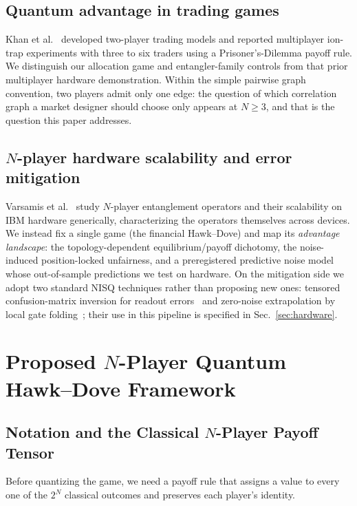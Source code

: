 \documentclass[conference,letterpaper,10pt]{IEEEtran}
\begin{document}
\subsection{Quantum advantage in trading games}
Khan et al.~\cite{khan2025} developed two-player trading models and reported
multiplayer ion-trap experiments with three to six traders using a
Prisoner's-Dilemma payoff rule. We distinguish our allocation game and
entangler-family controls from that prior multiplayer hardware demonstration. Within the simple pairwise graph convention, two players admit only one edge: the question of which correlation graph a market designer should
choose only appears at $N\ge3$, and that is the question this paper addresses.

\subsection{\texorpdfstring{$N$}{N}-player hardware scalability and error mitigation}
Varsamis et al.~\cite{varsamis2025} study $N$-player entanglement operators
and their scalability on IBM hardware generically, characterizing the operators themselves across devices. We instead fix a single game (the
financial Hawk--Dove) and map its \emph{advantage landscape}: the
topology-dependent equilibrium/payoff dichotomy, the noise-induced
position-locked unfairness, and a preregistered predictive noise model whose
out-of-sample predictions we test on hardware. On the mitigation side we adopt
two standard NISQ techniques rather than proposing new ones: tensored
confusion-matrix inversion for readout errors~\cite{maciejewski2020,bravyi2021pra} and zero-noise
extrapolation by local gate folding~\cite{temme2017,kandala2019}; their use in
this pipeline is specified in Sec.~\ref{sec:hardware}.



\section{Proposed $N$-Player Quantum Hawk--Dove Framework}\label{sec:model}

\subsection{Notation and the Classical \texorpdfstring{$N$}{N}-Player Payoff Tensor}
\label{sec:notation}
Before quantizing the game, we need a payoff rule that assigns a value to every
one of the $2^N$ classical outcomes and preserves each player's identity.
\end{document}

